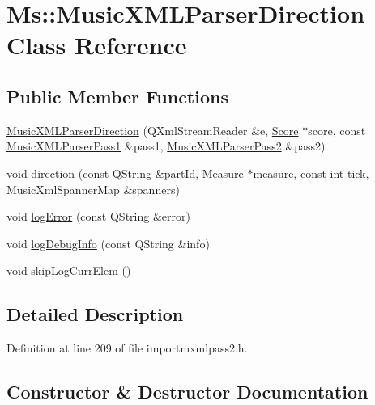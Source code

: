 \hypertarget{class_ms_1_1_music_x_m_l_parser_direction}{}\section{Ms\+:\+:Music\+X\+M\+L\+Parser\+Direction Class Reference}
\label{class_ms_1_1_music_x_m_l_parser_direction}
\subsection*{Public Member Functions}
\begin{DoxyCompactItemize}
\item 
\hyperlink{class_ms_1_1_music_x_m_l_parser_direction_ad718d8f199895cd27d32117f3229484a}{Music\+X\+M\+L\+Parser\+Direction} (Q\+Xml\+Stream\+Reader \&e, \hyperlink{class_ms_1_1_score}{Score} $\ast$score, const \hyperlink{class_ms_1_1_music_x_m_l_parser_pass1}{Music\+X\+M\+L\+Parser\+Pass1} \&pass1, \hyperlink{class_ms_1_1_music_x_m_l_parser_pass2}{Music\+X\+M\+L\+Parser\+Pass2} \&pass2)
\item 
void \hyperlink{class_ms_1_1_music_x_m_l_parser_direction_a288e85af15748149c954237d3b3b8688}{direction} (const Q\+String \&part\+Id, \hyperlink{class_ms_1_1_measure}{Measure} $\ast$measure, const int tick, Music\+Xml\+Spanner\+Map \&spanners)
\item 
void \hyperlink{class_ms_1_1_music_x_m_l_parser_direction_a06ec4ebe7b85a66090add2c30cad1e14}{log\+Error} (const Q\+String \&error)
\item 
void \hyperlink{class_ms_1_1_music_x_m_l_parser_direction_a9bf4e7ad2429e07b36ede47764c7a2ee}{log\+Debug\+Info} (const Q\+String \&info)
\item 
void \hyperlink{class_ms_1_1_music_x_m_l_parser_direction_a24827f168c7a6b544b422d0167aa5ad0}{skip\+Log\+Curr\+Elem} ()
\end{DoxyCompactItemize}


\subsection{Detailed Description}


Definition at line 209 of file importmxmlpass2.\+h.



\subsection{Constructor \& Destructor Documentation}
\mbox{\label{class_ms_1_1_music_x_m_l_parser_direction_ad718d8f199895cd27d32117f3229484a}} 
